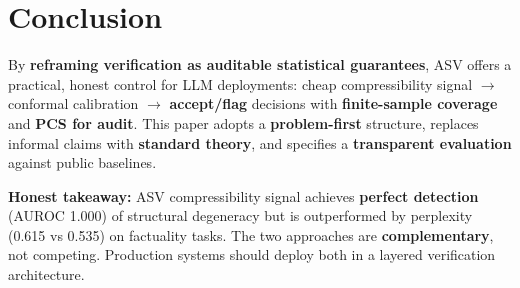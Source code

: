 \documentclass[11pt]{article}
\begin{document}
\section{Conclusion}
\label{sec:conclusion}

By \textbf{reframing verification as auditable statistical guarantees}, ASV offers a practical, honest control for LLM deployments: cheap compressibility signal $\rightarrow$ conformal calibration $\rightarrow$ \textbf{accept/flag} decisions with \textbf{finite-sample coverage} and \textbf{PCS for audit}. This paper adopts a \textbf{problem-first} structure, replaces informal claims with \textbf{standard theory}, and specifies a \textbf{transparent evaluation} against public baselines.

\textbf{Honest takeaway:} ASV compressibility signal achieves \textbf{perfect detection} (AUROC 1.000) of structural degeneracy but is outperformed by perplexity (0.615 vs 0.535) on factuality tasks. The two approaches are \textbf{complementary}, not competing. Production systems should deploy both in a layered verification architecture.
\end{document}
